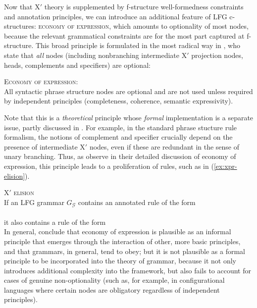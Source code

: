 \documentclass[output=paper,hidelinks]{langscibook}
\begin{document}
 Now that X$'$ theory is supplemented by f-structure well-formedness constraints and annotation principles, we can introduce an additional feature of LFG c-struc\-tures: \textsc{economy of expression}, which amounts to optionality of most nodes, because the relevant grammatical constraints are for the most part captured at f-structure. This broad principle is formulated in the most radical way in \textcite[90]{BresnanEtAl2016}, who state that \textit{all} nodes (including nonbranching intermediate X$'$ projection nodes, heads, complements and specifiers) are optional:
 
 \ea
  \textsc{Economy of expression:}\\
  All syntactic phrase structure nodes are optional and are not used unless required by independent principles (completeness, coherence, semantic expressivity). \parencite[90]{BresnanEtAl2016}
 \z
 
 Note that this is a \textit{theoretical} principle whose \textit{formal} implementation is a separate issue, partly discussed in . For example, in the standard phrase stucture rule formalism, the notions of complement and specifier crucially depend on the presence of intermediate X$'$ nodes, even if these are redundant in the sense of unary branching. Thus, as \textcite{Dalrympleetal2015} observe in their detailed discussion of economy of expression, this principle leads to a proliferation of rules, such as in (\ref{ex:xpr-elision}).
 
 \ea\label{ex:xpr-elision}
 \textsc{X$'$ elision} \parencite[384]{Dalrympleetal2015}\\
 If an LFG grammar $G_{\mathcal{G}}$ contains an annotated rule of the form\\
 \qquad {}\\
 it also contains a rule of the form\\
 \qquad {}
 \z
 In general, \textcite{Dalrympleetal2015} conclude that economy of expression is plausible as an informal principle that emerges through the interaction of other, more basic principles, and that grammars, in general, tend to obey; but it is not plausible as a formal principle to be incorporated into the theory of grammar, because it not only introduces additional complexity into the framework, but also fails to account for cases of genuine non-optionality (such as, for example, in configurational languages where certain nodes are obligatory regardless of independent principles).
 
\end{document}
